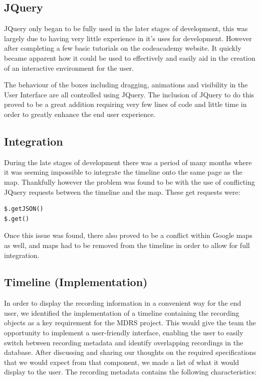 \documentclass{l3proj}
\begin{document}
\subsection{JQuery}
JQuery only began to be fully used in the later stages of development, this was largely due to having very little experience in it's uses for development. However after completing a few basic tutorials on the codeacademy website. It quickly became apparent how it could be used to effectively and easily aid in the creation of an interactive environment for the user.

The behaviour of the boxes including dragging, animations and visibility in the User Interface are all controlled using JQuery. The inclusion of
JQuery to do this proved to be a great addition requiring very few lines of code and little time in order to greatly enhance the end user experience.

\subsection{Integration}

During the late stages of development there was a period of many months where it was seeming impossible to integrate the timeline onto the same page as the map. Thankfully however the problem was found to be with the use of conflicting JQuery requests between the timeline and the map. These get requests were:
\begin{verbatim}
$.getJSON()
$.get()
\end{verbatim}
Once this issue was found, there also proved to be a conflict within Google maps as well, and maps had to be removed from the timeline in order to allow for full integration.

\subsection{Timeline (Implementation)}

In order to display the recording information in a convenient way for the end user, we identified the implementation of a timeline containing the recording objects as a key requirement for the MDRS project. This would give the team the opportunity to implement a user-friendly interface, enabling the user to easily switch between recording metadata and identify overlapping recordings in the database. After discussing and sharing our thoughts on the required specifications that we would expect from that component, we made a list of what it would display to the user. The recording metadata contains the following characteristics:
\end{document}
